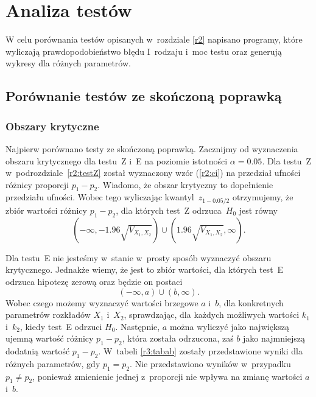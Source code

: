 \chapter{Analiza testów}
\label{r3}

W celu porównania testów opisanych w~rozdziale \ref{r2} napisano programy, które wyliczają prawdopodobieństwo błędu I~rodzaju i~moc testu oraz generują wykresy dla różnych parametrów.

\section{Porównanie testów ze skończoną poprawką}
\label{r3:skonczonetesty}

\subsection{Obszary krytyczne}
Najpierw porównano testy ze skończoną poprawką. Zacznijmy od wyznaczenia obszaru krytycznego dla testu~Z i~E na poziomie istotności $\alpha = 0.05$. Dla testu~Z w~podrozdziale~\ref{r2:testZ} został wyznaczony wzór (\ref{r2:ci}) na przedział ufności różnicy proporcji $p_1-p_2$. Wiadomo, że obszar krytyczny to dopełnienie przedziału ufności. Wobec tego wyliczając kwantyl~$z_{1-0.05/2}$ otrzymujemy, że zbiór wartości różnicy $p_1-p_2$, dla których test~Z odrzuca~$H_0$ jest równy
\begin{equation}
\left(-\infty,-1.96\sqrt{V_{X_1,X_2}}\right)\cup \left(1.96\sqrt{V_{X_1,X_2}}, \infty\right).
\end{equation}

Dla testu~E nie jesteśmy w~stanie w~prosty sposób wyznaczyć obszaru krytycznego. Jednakże wiemy, że jest to zbiór wartości, dla których test~E odrzuca hipotezę zerową oraz będzie on postaci
\begin{equation}
(-\infty,a)\cup (b, \infty).
\end{equation}
Wobec czego możemy wyznaczyć wartości brzegowe $a$ i~$b$, dla konkretnych parametrów rozkładów $X_1$ i~$X_2$, sprawdzając, dla każdych możliwych wartości $k_1$ i~$k_2$, kiedy test~E odrzuci $H_0$. Następnie, $a$ można wyliczyć jako największą ujemną wartość różnicy $p_1-p_2$, która została odrzucona, zaś $b$ jako najmniejszą dodatnią wartość $p_1-p_2$. W~tabeli \ref{r3:tabab} zostały przedstawione wyniki dla różnych parametrów, gdy $p_1=p_2$. Nie przedstawiono wyników w~przypadku $p_1\neq p_2$, ponieważ zmienienie jednej z~proporcji nie wpływa na zmianę wartości $a$ i~$b$.

